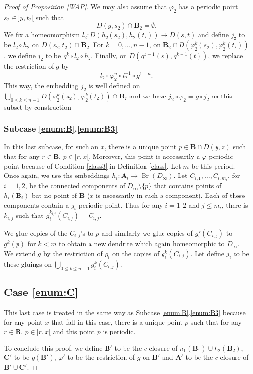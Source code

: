 \documentclass[JEP,XML,SOM,Unicode,NoFloatCountersInSection]{cedram}
\theoremstyle{plain}
\theoremstyle{definition}
\newcommand{\bA}{{\boldsymbol{A}}}
\newcommand{\bB}{{\boldsymbol{B}}}
\newcommand{\bC}{{\boldsymbol{C}}}
\DeclareMathOperator{\Br}{Br}
\begin{document}
\begin{proof}[Proof of Proposition \ref{WAP}]
We may also assume that $\varphi_2$ has a periodic point $s_2\in{}]y,t_2[$ such that
\[
D(y,s_2)\cap\bB_2=\emptyset.
\]
We fix a homeomorphism $l_2\colon D(h_2(s_2), h_2(t_2))\to D(s,t)$ and define $j_2$ to be $l_2\circ h_2$ on $D(s_2,t_2)\cap\bB_2$.
For $k=0,\dots,n-1$, on $\bB_{2}\cap D(\varphi_2^k(s_2),\varphi_2^k(t_2))$, we define $j_2$ to be $g^k\circ l_2\circ h_2$. Finally, on $D(g^{k-1}(s),g^{k-1}(t))$, we replace the restriction of $g$ by
\[
l_2\circ\varphi_2^n\circ l_2^{-1}\circ g^{1-n}.
\]
This way, the embedding $j_2$ is well defined on $\bigcup_{0\leq k\leq n-1} D(\varphi_2^k(s_2),\varphi_2^k(t_2))\cap \bB_2$ and we have $j_2\circ\varphi_2=g\circ j_2$ on this subset by construction.

\subsubsection*{Subcase \ref{enum:B}.\ref{enum:B3}} In this last subcase, for such an $x$, there is a unique point \hbox{$p\in \bB\cap D(y,z)$} such that for any $r\in \bB$, $p\in[r,x[$. Moreover, this point is necessarily a $\varphi$-periodic point because of Condition \eqref{class3} in Definition \ref{class}. Let $m$ be this period. Once again, we use the embeddings $h_i\colon \bA_i\to \Br(D_\infty)$. Let $C_{i,1},\dots,C_{i,m_i}$, for $i=1,2$, be the connected components of $D_\infty\setminus \{p\}$ that contains points of $h_i(\bB_i)$ but no point of $\bB$ ($x$ is necessarily in such a component). Each of these components contain a $g_i$-periodic point. Thus for any $i=1,2$ and $j\leq m_i$, there is $k_{i,j}$ such that $g_i^{k_{i,j}}(C_{i,j})=C_{i,j}$.

We glue copies of the $C_{i,j}$'s to $p$ and similarly we glue copies of $g_i^k(C_{i,j})$ to $g^k(p)$ for $k<m$ to obtain a new dendrite which again homeomorphic to $D_\infty$. We extend $g$ by the restriction of $g_i$ on the copies of $g_i^k(C_{i,j})$. Let define $j_i$ to be these gluings on $\bigcup_{0\leq k\leq n-1}g_i^k(C_{i,j})$.

\subsection*{Case \ref{enum:C}} This last case is treated in the same way as Subcase \ref{enum:B}.\ref{enum:B3} because for any point $x$ that fall in this case, there is a unique point $p$ such that for any $r\in \bB$, $p\in[r,x[$ and this point $p$ is periodic.

To conclude this proof, we define $\bB'$ to be the $c$-closure of $h_1(\bB_1)\cup h_2(\bB_2)$, $\bC'$ to be $g(\bB')$, $\varphi'$ to be the restriction of $g$ on $\bB'$ and $\bA'$ to be the $c$-closure of $\bB'\cup\bC'$.
\end{proof}
\end{document}
